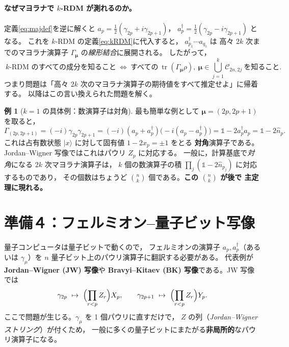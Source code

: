 \documentclass[11pt,a4paper]{ltjsarticle}
\newcommand{\ket}[1]{|#1\rangle}
\newcommand{\tr}{\operatorname{tr}}
\newcommand{\ad}{a^\dagger}
\newcommand{\Id}{\mathbb{1}}
\newcommand{\Cc}{\mathcal{C}}
\theoremstyle{definition}
\newtheorem{rei}{例}[section]
\theoremstyle{plain}
\begin{document}
\paragraph{なぜマヨラナで $k$-RDM が測れるのか。}
定義\eqref{eq:majdef}を逆に解くと $a_p=\tfrac12(\gamma_{2p}+i\gamma_{2p+1})$，
$\ad_p=\tfrac12(\gamma_{2p}-i\gamma_{2p+1})$ となる。
これを $k$-RDM の定義\eqref{eq:kRDM}に代入すると，
$\ad_{p_1}\cdots a_{q_1}$ は
高々 $2k$ 次までのマヨラナ演算子 $\Gamma_{\bm\mu}$ の\emph{線形結合}に展開される。
したがって，
\begin{equation}
  \boxed{\ \text{$k$-RDM のすべての成分を知ること}
    \ \Longleftrightarrow\
    \text{すべての}\ \tr(\Gamma_{\bm\mu}\rho),\
    \bm\mu\in\textstyle\bigcup_{j=1}^{k}\Cc_{2n,2j}\ \text{を知ること}. \ }
  \label{eq:equiv}
\end{equation}
つまり問題は「高々 $2k$ 次のマヨラナ演算子の期待値をすべて推定せよ」に帰着する。
以降はこの言い換えられた問題を解く。

\begin{rei}[$k=1$ の具体例：数演算子は対角]\label{rei:number}
最も簡単な例として $\bm\mu=(2p,2p+1)$ を取ると，
\[
  \Gamma_{(2p,2p+1)}=(-i)\gamma_{2p}\gamma_{2p+1}
  =(-i)(a_p+\ad_p)\bigl(-i(a_p-\ad_p)\bigr)
  =\Id-2\ad_p a_p=\Id-2\hat n_p .
\]
これは占有数状態 $\ket x$ に対して固有値 $1-2x_p=\pm1$ をとる
\textbf{対角}演算子である。Jordan--Wigner 写像ではこれはパウリ $Z_p$ に対応する。
一般に，計算基底で\emph{対角}になる $2k$ 次マヨラナ演算子は，
$k$ 個の数演算子の積 $\prod_{j}(\Id-2\hat n_{p_j})$ に対応するものであり，
その個数はちょうど $\binom{n}{k}$ 個である。\textbf{この $\binom{n}{k}$ が後で
主定理に現れる。}
\end{rei}

\section{準備４：フェルミオン--量子ビット写像}\label{sec:f2q}

量子コンピュータは量子ビットで動くので，
フェルミオンの演算子 $a_p,\ad_p$（あるいは $\gamma_\mu$）を
$n$ 量子ビット上のパウリ演算子に翻訳する必要がある。
代表例が\textbf{Jordan--Wigner (JW) 写像}や
\textbf{Bravyi--Kitaev (BK) 写像}である。JW 写像では
\begin{equation}
  \gamma_{2p}\ \mapsto\ \Bigl(\prod_{r<p}Z_r\Bigr)X_p,\qquad
  \gamma_{2p+1}\ \mapsto\ \Bigl(\prod_{r<p}Z_r\Bigr)Y_p .
  \label{eq:JW}
\end{equation}
ここで問題が生じる。$\gamma_\mu$ を 1 個パウリに直すだけで，
$Z$ の列（\emph{Jordan--Wigner ストリング}）が付くため，
一般に多くの量子ビットにまたがる\textbf{非局所的}なパウリ演算子になる。
\end{document}
